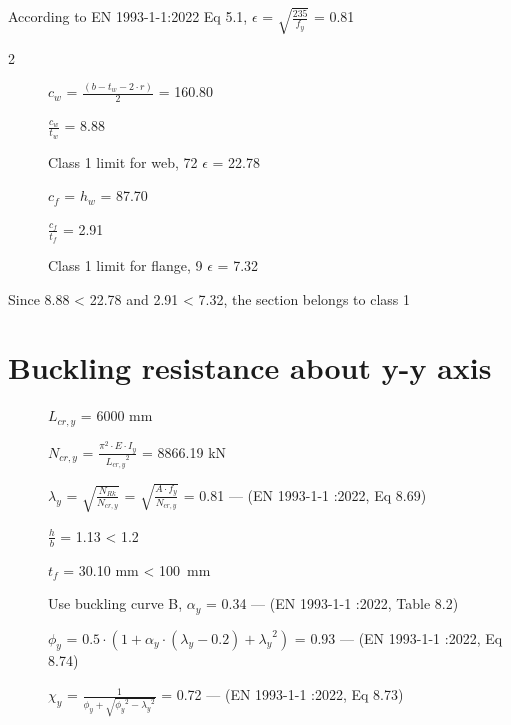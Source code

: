 \documentclass[
  letterpaper,
  DIV=11,
  numbers=noendperiod]{scrartcl}
\begin{document}
According to EN 1993-1-1:2022 Eq 5.1, \(\epsilon\) =
\(\sqrt{\frac{235}{f_{y}}}\) = 0.81

\begin{multicols}{2}
\begin{description}
  \item[]$c_{w}$ = $\frac{(b-t_{w}-2\cdot r)}{2}$ = 160.80  
  \item[] $\frac{c_{w}}{t_{w}}$ = 8.88
  \item[]Class 1 limit for web, 72 $\epsilon $ = 22.78
  \item[]$c_{f}$ = $h_{w}$ = 87.70 
  \item[]$\frac{c_{f}}{t_{f}}$ = 2.91
  \item[]Class 1 limit for flange, 9 $\epsilon$ = 7.32
\end{description}  
\end{multicols}

Since 8.88 \textless{} 22.78 and 2.91 \textless{} 7.32, the section
belongs to class 1

\section{Buckling resistance about y-y
axis}\label{buckling-resistance-about-y-y-axis}

\begin{description}
  \item[]$L_{cr,y}$ = 6000 mm
  \item[]$N_{cr,y}$ = $\frac{\pi^{2}\cdot E\cdot I_{y}}{{L_{cr,y}}^{2}}$ = 8866.19 kN
  \item[]$\lambda_{y}$ =  $\sqrt{\frac{N_{Rk}}{N_{cr,y}}}$ = $\sqrt{\frac{A\cdot f_{y}}{N_{cr,y}}}$ = 0.81 --- (EN 1993-1-1 :2022, Eq 8.69)
  \item[]$\frac{h}{b}$ = 1.13 < 1.2
  \item[]$t_{f}$ = 30.10 mm < 100~mm
  \item[]Use buckling curve B,  $\alpha_{y}$ = 0.34 --- (EN 1993-1-1 :2022, Table 8.2)
  \item[]$\phi_{y}$ = $0.5 \cdot (1 + \alpha_{y} \cdot (\lambda_{y} - 0.2) + {\lambda_{y}}^{2})$ = 0.93 --- (EN 1993-1-1 :2022, Eq 8.74)
  \item[]$\chi_{y}$ = $\frac{1}{\phi_{y} + \sqrt{{\phi_{y}}^{2} - {\lambda_{y}}^{2}}}$ = 0.72 --- (EN 1993-1-1 :2022, Eq 8.73)
\end{description}

\newpage{}

\section{}\label{section-10}
\end{document}
